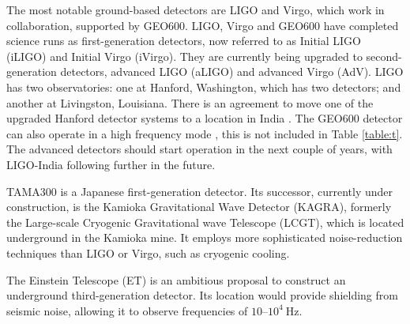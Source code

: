The most notable ground-based detectors are LIGO and Virgo, which work in collaboration, supported by GEO600. LIGO, Virgo and GEO600 have completed science runs as first-generation detectors, now referred to as Initial LIGO (iLIGO) and Initial Virgo (iVirgo). They are currently being upgraded to second-generation detectors, advanced LIGO (aLIGO) and advanced Virgo (AdV). LIGO has two observatories: one at Hanford, Washington, which has two detectors; and another at Livingston, Louisiana. There is an agreement to move one of the upgraded Hanford detector systems to a location in India \citep{LIGO-India,Unnikrishnan2013}. The GEO600 detector can also operate in a high frequency mode \citep[GEO-HF]{2006CQGra..23S.207W}, this is not included in Table \ref{table:t}. The advanced detectors should start operation in the next couple of years, with LIGO-India following further in the future.

TAMA300 is a Japanese first-generation detector. Its successor, currently under construction, is the Kamioka Gravitational Wave Detector (KAGRA), formerly the Large-scale Cryogenic Gravitational wave Telescope (LCGT), which is located underground in the Kamioka mine. It employs more sophisticated noise-reduction techniques than LIGO or Virgo, such as cryogenic cooling.

The Einstein Telescope (ET) is an ambitious proposal to construct an underground third-generation detector. Its location would provide shielding from seismic noise, allowing it to observe frequencies of $10$--$10^4~\mathrm{Hz}$. 

